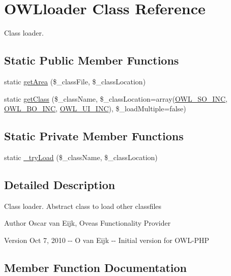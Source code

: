 \section{OWLloader Class Reference}
\label{classOWLloader}


Class loader.  


\subsection*{Static Public Member Functions}
\begin{DoxyCompactItemize}
\item 
static \hyperlink{classOWLloader_a7a405369cad4d0a09f82cad218bc4824}{getArea} (\$\_\-classFile, \$\_\-classLocation)
\item 
static \hyperlink{classOWLloader_a271d6508b029b3989db57f4d9b9b7677}{getClass} (\$\_\-className, \$\_\-classLocation=array(\hyperlink{OWLloader_8php_a75dffdef5ba58a0ba5f21ed40627897f}{OWL\_\-SO\_\-INC}, \hyperlink{OWLloader_8php_aca50646bc73c3addf0e0f25081eae0ae}{OWL\_\-BO\_\-INC}, \hyperlink{OWLloader_8php_a2e11101c70f011a91d0d9c7f8e217738}{OWL\_\-UI\_\-INC}), \$\_\-loadMultiple=false)
\end{DoxyCompactItemize}
\subsection*{Static Private Member Functions}
\begin{DoxyCompactItemize}
\item 
static \hyperlink{classOWLloader_a763911b4bc08982e24f1f897362f8c90}{\_\-tryLoad} (\$\_\-className, \$\_\-classLocation)
\end{DoxyCompactItemize}


\subsection{Detailed Description}
Class loader. Abstract class to load other classfiles \begin{DoxyAuthor}{Author}
Oscar van Eijk, Oveas Functionality Provider 
\end{DoxyAuthor}
\begin{DoxyVersion}{Version}
Oct 7, 2010 -\/-\/ O van Eijk -\/-\/ Initial version for OWL-\/PHP 
\end{DoxyVersion}


\subsection{Member Function Documentation}

